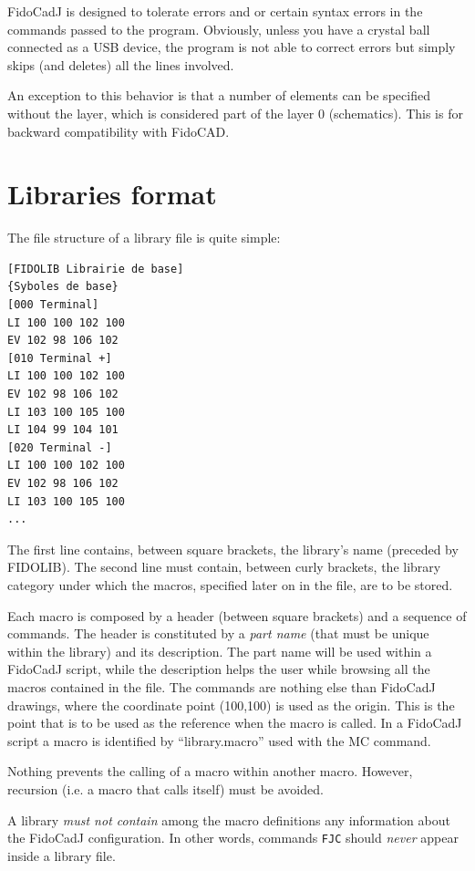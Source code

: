 \documentclass[10pt,a4paper,twoside]{scrreprt}
\begin{document}
FidoCadJ is designed to tolerate errors and 
or certain syntax errors in the commands passed to the program. Obviously,
unless you have a crystal ball connected as a USB device,
the program is not able to correct errors but simply
skips (and deletes) all the lines involved.

An exception to this behavior is that a number of elements can
be specified without the layer, which is considered part of the
layer 0 (schematics). This is for backward compatibility
with FidoCAD.


\section{Libraries format}

The file structure of a library file is quite simple:

\begin{lstlisting}
[FIDOLIB Librairie de base]
{Syboles de base}
[000 Terminal]
LI 100 100 102 100
EV 102 98 106 102
[010 Terminal +]
LI 100 100 102 100
EV 102 98 106 102
LI 103 100 105 100
LI 104 99 104 101
[020 Terminal -]
LI 100 100 102 100
EV 102 98 106 102
LI 103 100 105 100
...
\end{lstlisting}
The first
line contains, between square brackets, the
library's name (preceded by FIDOLIB). The second line
must contain, between curly brackets, the library category under which
the macros, specified later on in the file, are to be stored.

Each macro is composed by a header (between square
brackets) and a sequence of commands. The header is constituted by
a \emph{part name} (that must be unique within the library) and its
description. The part name will be used within a FidoCadJ script, while
the description helps the user while browsing all the macros
contained in the file. The commands are nothing else than FidoCadJ
drawings, where the coordinate point (100,100) is used as the origin.
This is the point that is to be used as the reference when the macro
is called. In a FidoCadJ script a macro is identified by ``library.macro''
used with the MC command.

Nothing prevents the calling of a macro within another macro. However,
recursion (i.e. a macro that calls itself) must
be avoided.

A library \textit{must not contain} among the macro definitions any information about the FidoCadJ configuration. In other words, commands \lstinline!FJC! should \textit{never} appear inside a library file.
\end{document}
